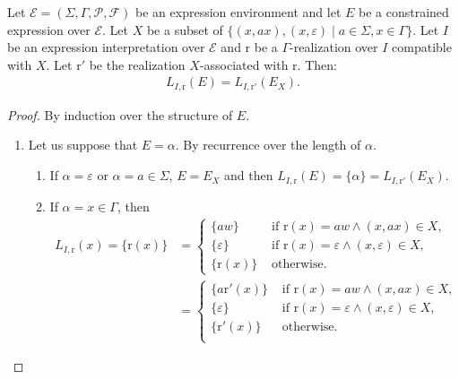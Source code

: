 \documentclass[a4paper]{llncs}
\begin{document}
  
  \begin{lemma}\label{lem r assoc egal r}
    Let $\mathcal{E}=(\Sigma,\Gamma,\mathcal{P},\mathcal{F})$ be an expression environment and let $E$ be a constrained expression over $\mathcal{E}$. Let $X$ be a subset of $\{(x,ax),(x,\varepsilon)\mid a\in\Sigma,x\in\Gamma\}$. Let $I$ be an expression interpretation over $\mathcal{E}$ and $\mathrm{r}$ be a $\Gamma$-realization over $I$ compatible with $X$. Let $\mathrm{r}'$ be the realization $X$-associated with $\mathrm{r}$. Then:
        \begin{align*}
      L_{I,\mathrm{r}}(E)=L_{I,\mathrm{r}'}(E_X).
        \end{align*}
  \end{lemma}
  \begin{proof}
    By induction over the structure of $E$.
    \begin{enumerate}
      \item Let us suppose that $E=\alpha$. 
        By recurrence over the length of $\alpha$.
        \begin{enumerate}
          \item If $\alpha=\varepsilon$ or $\alpha=a\in\Sigma$, $E=E_X$ and then $L_{I,\mathrm{r}}(E)=\{\alpha\}=L_{I,\mathrm{r}'}(E_X)$.
          \item If $\alpha=x\in\Gamma$, then           
        \begin{align*}
          L_{I,\mathrm{r}}(x)=\{\mathrm{r}(x)\} & =
            \begin{cases}
                      \{aw\} & \text{ if } \mathrm{r}(x)=aw\wedge (x,ax)\in X,\\
                      \{\varepsilon\} & \text{ if } \mathrm{r}(x)=\varepsilon \wedge (x,\varepsilon)\in X,\\
                      \{\mathrm{r}(x)\} & \text{ otherwise.}
            \end{cases}\\              
                  & =
            \begin{cases}
                      \{a\mathrm{r}'(x)\}& \text{ if } \mathrm{r}(x)=aw\wedge (x,ax)\in X,\\
                      \{\varepsilon\} & \text{ if } \mathrm{r}(x)=\varepsilon \wedge (x,\varepsilon)\in X,\\
                          \{\mathrm{r}'(x)\} & \text{ otherwise.}\\
                    \end{cases}
        \end{align*}
              

\end{enumerate}
\end{enumerate}
\end{proof}
\end{document}
